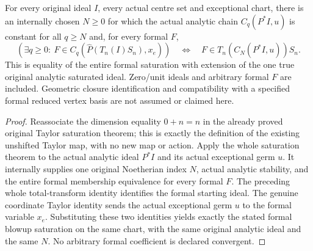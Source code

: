 \begin{theorem}
\label{hir:actual-analytic-formal-blowup-whole-saturation}
\leanok
For every original ideal $I$, every actual centre set and exceptional chart,
there is an internally chosen $N\geq0$ for which the actual analytic chain
$C_q(P^*I,u)$ is constant for all $q\geq N$ and, for every formal $F$,
\[
 (\exists q\geq0:\ F\in C_q(\widehat P(T_n(I)S_n),x_e))
 \quad\Longleftrightarrow\quad
 F\in T_n(C_N(P^*I,u))S_n.
\]
This is equality of the entire formal saturation with extension of the
one true original analytic saturated ideal. Zero/unit ideals and arbitrary
formal $F$ are included. Geometric closure identification and compatibility
with a specified formal reduced vertex basis are not assumed or claimed here.
\end{theorem}
\begin{proof}
Reassociate the dimension equality $0+n=n$ in the already proved original
Taylor saturation theorem; this is exactly the definition of the existing
unshifted Taylor map, with no new map or action. Apply the whole saturation
theorem to the actual analytic ideal $P^*I$ and its actual exceptional germ
$u$. It internally supplies one original Noetherian index $N$, actual
analytic stability, and the entire formal membership equivalence for every
formal $F$. The preceding whole total-transform identity identifies the
formal starting ideal. The genuine coordinate Taylor identity sends the
actual exceptional germ $u$ to the formal variable $x_e$. Substituting these
two identities yields exactly the stated formal blowup saturation on the
same chart, with the same original analytic ideal and the same $N$.
No arbitrary formal coefficient is declared convergent.
\end{proof}
